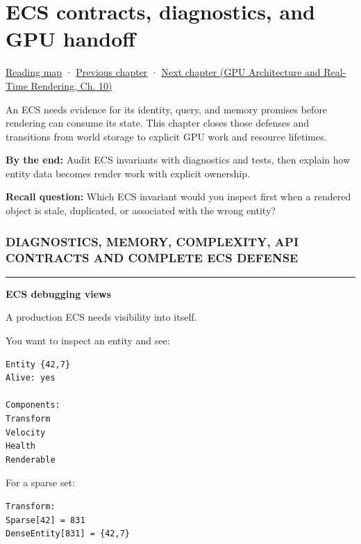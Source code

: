\chapter{ECS contracts, diagnostics, and GPU handoff}\label{05-engine-i-ch018-ecs-contracts-diagnostics-and-gpu-handoff}\hypertarget{05-engine-i-ch018}{}\label{stagechapter:05-engine-i-ch018}

\hyperref[volume-reading-map]{Reading map} · \hyperref[05-engine-i-ch017-ecs-performance-through-cache-and-scheduling]{Previous chapter} · \href{../06-GPU-Architecture-and-Real-Time-Rendering/main.pdf\#nameddest=05-engine-i-ch019-gpu-work-and-reusable-metal-frames}{Next chapter (GPU Architecture and Real-Time Rendering, Ch. 10)}

An ECS needs evidence for its identity, query, and memory promises before rendering can consume its state. This chapter closes those defenses and transitions from world storage to explicit GPU work and resource lifetimes.

\textbf{By the end:} Audit ECS invariants with diagnostics and tests, then explain how entity data becomes render work with explicit ownership.

\textbf{Recall question:} Which ECS invariant would you inspect first when a rendered object is stale, duplicated, or associated with the wrong entity?

\subsection{DIAGNOSTICS, MEMORY, COMPLEXITY, API CONTRACTS AND COMPLETE ECS DEFENSE}\label{05-engine-i-ch018-diagnostics-memory-complexity-api-contracts-and-complete-ecs-defense}

\begin{center}\rule{0.5\linewidth}{0.5pt}\end{center}

\textbf{ECS debugging views}

A production ECS needs visibility into itself.

You want to inspect an entity and see:

\begin{verbatim}
Entity {42,7}
Alive: yes

Components:
Transform
Velocity
Health
Renderable
\end{verbatim}

For a sparse set:

\begin{verbatim}
Transform:
Sparse[42] = 831
DenseEntity[831] = {42,7}
\end{verbatim}

